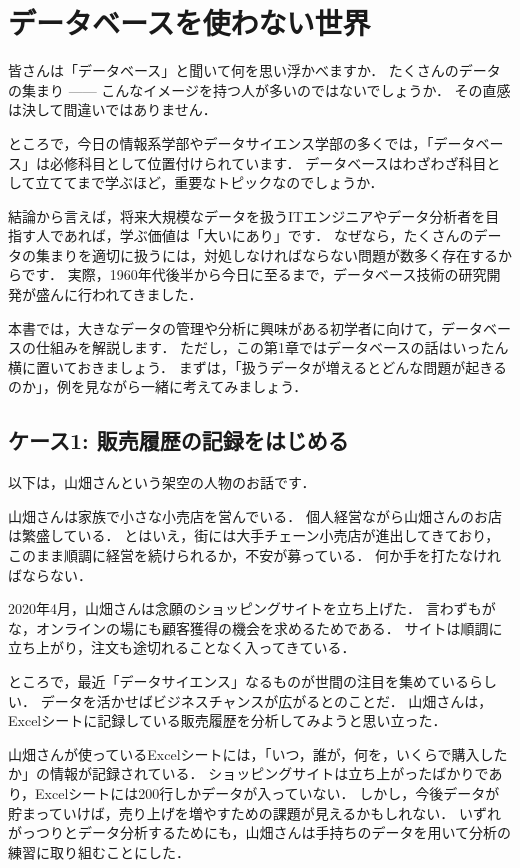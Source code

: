 \chapter{データベースを使わない世界}
皆さんは「データベース」と聞いて何を思い浮かべますか．
たくさんのデータの集まり —— こんなイメージを持つ人が多いのではないでしょうか．
その直感は決して間違いではありません．

ところで，今日の情報系学部やデータサイエンス学部の多くでは，「データベース」は必修科目として位置付けられています．
データベースはわざわざ科目として立ててまで学ぶほど，重要なトピックなのでしょうか．

結論から言えば，将来大規模なデータを扱うITエンジニアやデータ分析者を目指す人であれば，学ぶ価値は「大いにあり」です．
なぜなら，たくさんのデータの集まりを適切に扱うには，対処しなければならない問題が数多く存在するからです．
実際，1960年代後半から今日に至るまで，データベース技術の研究開発が盛んに行われてきました\cite{Stonebraker1976, Astrahan1976}．

本書では，大きなデータの管理や分析に興味がある初学者に向けて，データベースの仕組みを解説します．
ただし，この第1章ではデータベースの話はいったん横に置いておきましょう．
まずは，「扱うデータが増えるとどんな問題が起きるのか」，例を見ながら一緒に考えてみましょう．


\section{ケース1: 販売履歴の記録をはじめる}
以下は，山畑さんという架空の人物のお話です．

\begin{framed}
山畑さんは家族で小さな小売店を営んでいる．
個人経営ながら山畑さんのお店は繁盛している．
とはいえ，街には大手チェーン小売店が進出してきており，このまま順調に経営を続けられるか，不安が募っている．
何か手を打たなければならない．

2020年4月，山畑さんは念願のショッピングサイトを立ち上げた．
言わずもがな，オンラインの場にも顧客獲得の機会を求めるためである．
サイトは順調に立ち上がり，注文も途切れることなく入ってきている．

ところで，最近「データサイエンス」なるものが世間の注目を集めているらしい．
データを活かせばビジネスチャンスが広がるとのことだ．
山畑さんは，Excelシートに記録している販売履歴を分析してみようと思い立った．

山畑さんが使っているExcelシートには，「いつ，誰が，何を，いくらで購入したか」の情報が記録されている．
ショッピングサイトは立ち上がったばかりであり，Excelシートには200行しかデータが入っていない．
しかし，今後データが貯まっていけば，売り上げを増やすための課題が見えるかもしれない．
いずれがっつりとデータ分析するためにも，山畑さんは手持ちのデータを用いて分析の練習に取り組むことにした．
\end{framed}

